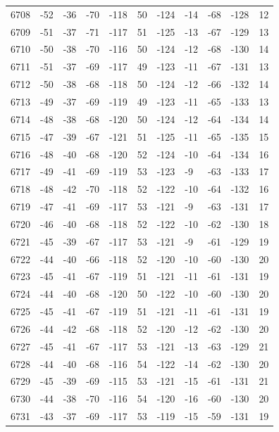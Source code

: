 \begin{table}[H]
\begin{tabular}{lllllllllll}
6708 & -52 & -36 & -70 & -118 & 50 & -124 & -14 & -68 & -128 & 12 \\
6709 & -51 & -37 & -71 & -117 & 51 & -125 & -13 & -67 & -129 & 13 \\
6710 & -50 & -38 & -70 & -116 & 50 & -124 & -12 & -68 & -130 & 14 \\
6711 & -51 & -37 & -69 & -117 & 49 & -123 & -11 & -67 & -131 & 13 \\
6712 & -50 & -38 & -68 & -118 & 50 & -124 & -12 & -66 & -132 & 14 \\
6713 & -49 & -37 & -69 & -119 & 49 & -123 & -11 & -65 & -133 & 13 \\
6714 & -48 & -38 & -68 & -120 & 50 & -124 & -12 & -64 & -134 & 14 \\
6715 & -47 & -39 & -67 & -121 & 51 & -125 & -11 & -65 & -135 & 15 \\
6716 & -48 & -40 & -68 & -120 & 52 & -124 & -10 & -64 & -134 & 16 \\
6717 & -49 & -41 & -69 & -119 & 53 & -123 & -9 & -63 & -133 & 17 \\
6718 & -48 & -42 & -70 & -118 & 52 & -122 & -10 & -64 & -132 & 16 \\
6719 & -47 & -41 & -69 & -117 & 53 & -121 & -9 & -63 & -131 & 17 \\
6720 & -46 & -40 & -68 & -118 & 52 & -122 & -10 & -62 & -130 & 18 \\
6721 & -45 & -39 & -67 & -117 & 53 & -121 & -9 & -61 & -129 & 19 \\
6722 & -44 & -40 & -66 & -118 & 52 & -120 & -10 & -60 & -130 & 20 \\
6723 & -45 & -41 & -67 & -119 & 51 & -121 & -11 & -61 & -131 & 19 \\
6724 & -44 & -40 & -68 & -120 & 50 & -122 & -10 & -60 & -130 & 20 \\
6725 & -45 & -41 & -67 & -119 & 51 & -121 & -11 & -61 & -131 & 19 \\
6726 & -44 & -42 & -68 & -118 & 52 & -120 & -12 & -62 & -130 & 20 \\
6727 & -45 & -41 & -67 & -117 & 53 & -121 & -13 & -63 & -129 & 21 \\
6728 & -44 & -40 & -68 & -116 & 54 & -122 & -14 & -62 & -130 & 20 \\
6729 & -45 & -39 & -69 & -115 & 53 & -121 & -15 & -61 & -131 & 21 \\
6730 & -44 & -38 & -70 & -116 & 54 & -120 & -16 & -60 & -130 & 20 \\
6731 & -43 & -37 & -69 & -117 & 53 & -119 & -15 & -59 & -131 & 19 \\

\end{tabular}
\end{table}
